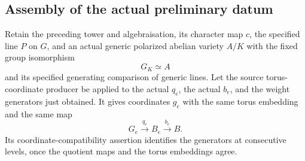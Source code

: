 \subsection{Assembly of the actual preliminary datum}
Retain the preceding tower and algebraisation, its character map
\(c\), the specified line \(P\) on \(G\), and an actual generic
polarized abelian variety \(A/K\) with the fixed group isomorphism
\[
                    G_K\simeq A
\]
and its specified generating comparison of generic lines.
Let the source torus-coordinate producer be applied to the actual
\(q_e\), the actual \(b_e\), and the weight generators just obtained.
It gives coordinates \(g_e\) with the same torus embedding and the
same map
\[
                        G_e\xrightarrow{q_e}B_e
                                  \xrightarrow{b_e}B .
\]
Its coordinate-compatibility assertion
 identifies the
generators at consecutive levels, once the quotient maps and the
torus embeddings agree.

